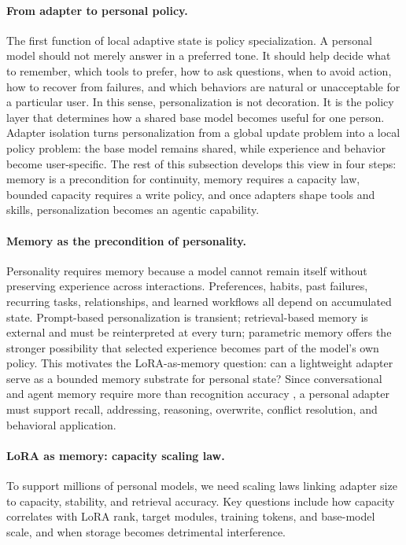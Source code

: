\documentclass{llmxive}
\providecommand{\pony}[1]{#1}
\begin{document}
\paragraph{From adapter to personal policy.}
\pony{The first function of local adaptive state is policy specialization. A personal model should not merely answer in a preferred tone. It should help decide what to remember, which tools to prefer, how to ask questions, when to avoid action, how to recover from failures, and which behaviors are natural or unacceptable for a particular user. In this sense, personalization is not decoration. It is the policy layer that determines how a shared base model becomes useful for one person. Adapter isolation turns personalization from a global update problem into a local policy problem: the base model remains shared, while experience and behavior become user-specific. The rest of this subsection develops this view in four steps: memory is a precondition for continuity, memory requires a capacity law, bounded capacity requires a write policy, and once adapters shape tools and skills, personalization becomes an agentic capability.}

\paragraph{Memory as the precondition of personality.} 
Personality requires memory because a model cannot remain itself without preserving experience across interactions. Preferences, habits, past failures, recurring tasks, relationships, and learned workflows all depend on accumulated state. Prompt-based personalization is transient; retrieval-based memory is external and must be reinterpreted at every turn; parametric memory offers the stronger possibility that selected experience becomes part of the model's own policy. This motivates the LoRA-as-memory question: can a lightweight adapter serve as a bounded memory substrate for personal state? Since conversational and agent memory require more than recognition accuracy \citep{packer2024memgpt,chhikara2025mem0,maharana2024longmemory}, a personal adapter must support recall, addressing, reasoning, overwrite, conflict resolution, and behavioral application.



\paragraph{LoRA as memory: capacity scaling law.}
To support millions of personal models, we need scaling laws linking adapter size to capacity, stability, and retrieval accuracy. Key questions include how capacity correlates with LoRA rank, target modules, training tokens, and base-model scale, and when storage becomes detrimental interference.
\end{document}
